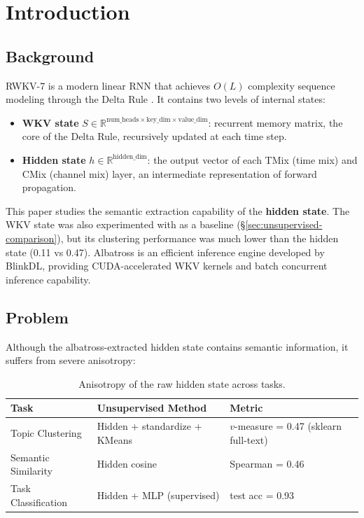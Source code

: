 \documentclass[11pt]{article}
\begin{document}
\section{Introduction}

\subsection{Background}

RWKV-7 \cite{rwkv7} is a modern linear RNN that achieves $O(L)$ complexity
sequence modeling through the Delta Rule \cite{deltarule}. It contains two
levels of internal states:

\begin{itemize}
  \item \textbf{WKV state} $S \in \mathbb{R}^{\text{num\_heads} \times
  \text{key\_dim} \times \text{value\_dim}}$: recurrent memory matrix, the
  core of the Delta Rule, recursively updated at each time step.
  \item \textbf{Hidden state} $h \in \mathbb{R}^{\text{hidden\_dim}}$: the
  output vector of each TMix (time mix) and CMix (channel mix) layer, an
  intermediate representation of forward propagation.
\end{itemize}

This paper studies the semantic extraction capability of the \textbf{hidden
state}. The WKV state was also experimented with as a baseline
(\S\ref{sec:unsupervised-comparison}), but its clustering performance was
much lower than the hidden state (0.11 vs 0.47). Albatross \cite{albatross}
is an efficient inference engine developed by BlinkDL, providing
CUDA-accelerated WKV kernels and batch concurrent inference capability.

\subsection{Problem}

Although the albatross-extracted hidden state contains semantic information,
it suffers from severe anisotropy:

\begin{table}[h]
\centering
\begin{tabular}{lll}
\toprule
Task & Unsupervised Method & Metric \\
\midrule
Topic Clustering & Hidden + standardize + KMeans & $v$-measure = 0.47 (sklearn full-text) \\
Semantic Similarity & Hidden cosine & Spearman = 0.46 \\
Task Classification & Hidden + MLP (supervised) & test acc = 0.93 \\
\bottomrule
\end{tabular}
\caption{Anisotropy of the raw hidden state across tasks.}
\end{table}
\end{document}
